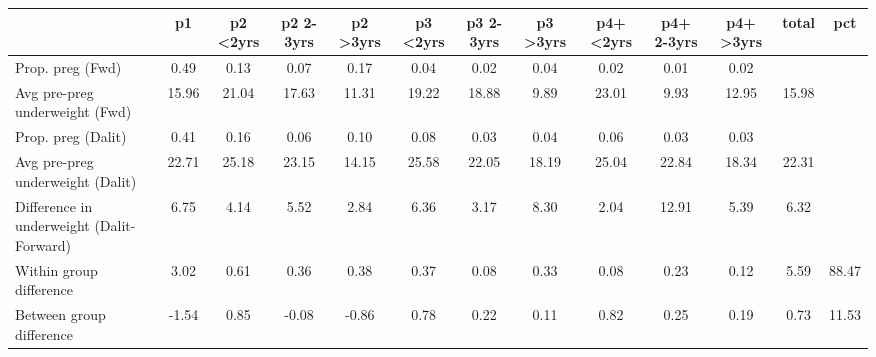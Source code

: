 \begin{tabular}{l*{12}{c}}
\toprule
            &\multicolumn{1}{c}{p1}&\multicolumn{1}{c}{p2 \textless2yrs}&\multicolumn{1}{c}{p2 2-3yrs}&\multicolumn{1}{c}{p2 \textgreater3yrs}&\multicolumn{1}{c}{p3 \textless2yrs}&\multicolumn{1}{c}{p3 2-3yrs}&\multicolumn{1}{c}{p3 \textgreater3yrs}&\multicolumn{1}{c}{p4+ \textless2yrs}&\multicolumn{1}{c}{p4+ 2-3yrs}&\multicolumn{1}{c}{p4+ \textgreater3yrs}&\multicolumn{1}{c}{total}&\multicolumn{1}{c}{pct}\\
\midrule
\midrule
Prop. preg (Fwd)&        0.49&        0.13&        0.07&        0.17&        0.04&        0.02&        0.04&        0.02&        0.01&        0.02&            &            \\
Avg pre-preg underweight (Fwd)&       15.96&       21.04&       17.63&       11.31&       19.22&       18.88&        9.89&       23.01&        9.93&       12.95&       15.98&            \\
Prop. preg (Dalit)&        0.41&        0.16&        0.06&        0.10&        0.08&        0.03&        0.04&        0.06&        0.03&        0.03&            &            \\
Avg pre-preg underweight (Dalit)&       22.71&       25.18&       23.15&       14.15&       25.58&       22.05&       18.19&       25.04&       22.84&       18.34&       22.31&            \\
Difference in underweight (Dalit-Forward)&        6.75&        4.14&        5.52&        2.84&        6.36&        3.17&        8.30&        2.04&       12.91&        5.39&        6.32&            \\
Within group difference&        3.02&        0.61&        0.36&        0.38&        0.37&        0.08&        0.33&        0.08&        0.23&        0.12&        5.59&       88.47\\
Between group difference&       -1.54&        0.85&       -0.08&       -0.86&        0.78&        0.22&        0.11&        0.82&        0.25&        0.19&        0.73&       11.53\\
\bottomrule
\end{tabular}
